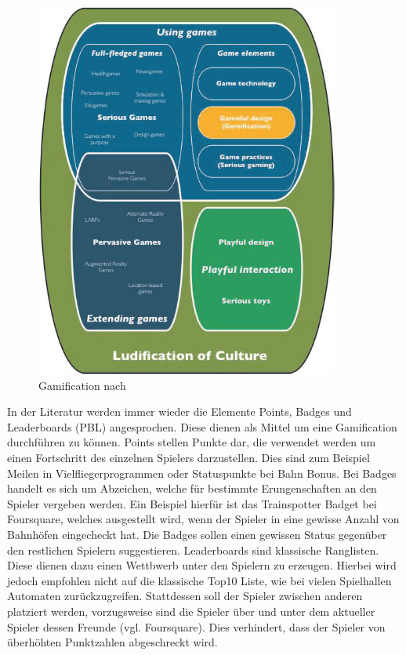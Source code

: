 \begin{figure}[H]
\begin{center}
\includegraphics[width=100mm]{images/ch3_img02_gamification.png}
\caption{Gamification nach \textcite{Deterding.2011}}
\label{img:ch3_img02_gamification}
\end{center}
\end{figure}

In der Literatur werden immer wieder die Elemente Points, Badges und Leaderboards (PBL) angesprochen. Diese dienen als Mittel um eine Gamification durchführen zu können. 
Points stellen Punkte dar, die verwendet werden um einen Fortschritt des einzelnen Spielers darzustellen. Dies sind zum Beispiel Meilen in Vielfliegerprogrammen oder Statuspunkte bei Bahn Bonus.
Bei Badges handelt es sich um Abzeichen, welche für bestimmte Erungenschaften an den Spieler vergeben werden. Ein Beispiel hierfür ist das Trainspotter Badget bei Foursquare, welches ausgestellt wird, wenn der Spieler in eine gewisse Anzahl von Bahnhöfen eingecheckt hat. Die Badges sollen einen gewissen Status gegenüber den restlichen Spielern suggestieren.
Leaderboards sind klassische Ranglisten. Diese dienen dazu einen Wettbwerb unter den Spielern zu erzeugen. Hierbei wird jedoch empfohlen nicht auf die klassische Top10 Liste, wie bei vielen Spielhallen Automaten zurückzugreifen. Stattdessen soll der Spieler zwischen anderen platziert werden, vorzugsweise sind die Spieler über und unter dem aktueller Spieler dessen Freunde (vgl. Foursquare). Dies verhindert, dass der Spieler von überhöhten Punktzahlen abgeschreckt wird.

